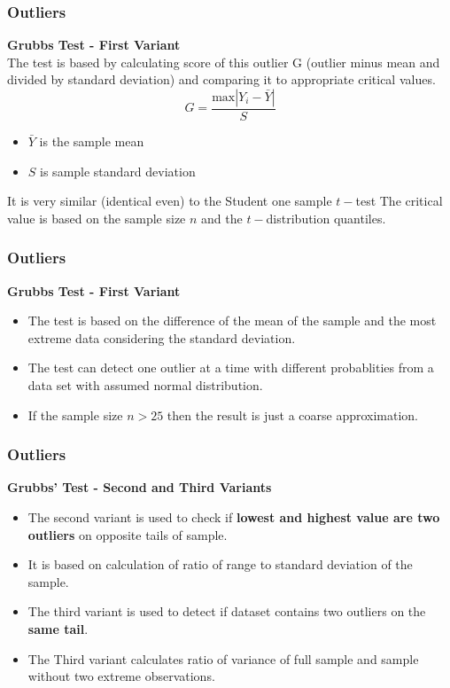\documentclass{beamer}
\begin{document}
\begin{frame}[fragile]
	\frametitle{Outliers}
	\Large
	\textbf{Grubbs Test - First Variant}\\
	The test is based by calculating score of this outlier G (outlier minus mean and divided
	by standard deviation) and comparing it to appropriate critical values.
	\[ G = \frac{\mbox{max}|Y_i-\bar{Y}|}{S} \]
	
	\begin{itemize}
		\item $\bar{Y}$ is the sample mean
		\item $S$ is sample standard deviation
	\end{itemize}
	It is very similar (identical even) to the Student one sample $t-$test
 	The critical value is based on the sample size $n$ and the $t-$distribution quantiles. 
	
\end{frame}
\begin{frame}[fragile]
	\frametitle{Outliers}
	\Large
	\textbf{Grubbs Test - First Variant}
	\begin{itemize}
		\item The test is based on the difference of the mean of the sample and the most
		extreme data considering the standard deviation.
		\item The test can detect one outlier at a time with different probablities from a data set with assumed normal distribution. 
		\item If the sample size $n>25$ then the result is
		just a coarse approximation.
	\end{itemize}
\end{frame}
\begin{frame}[fragile]
	\frametitle{Outliers}
	\Large
	\textbf{Grubbs' Test - Second and Third Variants}
	
	
	\begin{itemize}
\item The second variant is used to check if \textbf{lowest and highest value are two outliers} on opposite tails of
	sample. 
\item It is based on calculation of ratio of range to standard deviation of the sample.
\bigskip
\item The third variant is used to detect if dataset contains two outliers on the \textbf{same tail}.
\item The Third variant calculates ratio of variance of full sample and sample without two extreme observations.

\end{itemize}
\end{frame}
\end{document}
